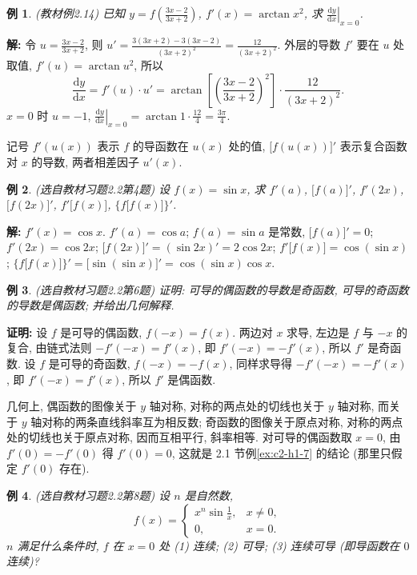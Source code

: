 \documentclass[UTF8,openany]{ctexbook}
\theoremstyle{chinesetextbook}
\newtheorem{example}{例}[section]
\newenvironment{cnproof}{\par\indent\textbf{证明:} \ignorespaces}{\par}
\newenvironment{cnsolution}{\par\indent\textbf{解:} \ignorespaces}{\par}
\newcommand{\dd}{\mathrm d}
\begin{document}
\begin{example}\label{ex:c2-2-14}
\textnormal{(教材例2.14)} 已知 $\displaystyle y=f\left(\frac{3x-2}{3x+2}\right)$, $f'(x)=\arctan x^2$, 求 $\displaystyle\left.\frac{\dd y}{\dd x}\right|_{x=0}$.
\end{example}
\begin{cnsolution}
令 $\displaystyle u=\frac{3x-2}{3x+2}$, 则 $\displaystyle u'=\frac{3(3x+2)-3(3x-2)}{(3x+2)^2}=\frac{12}{(3x+2)^2}$. 外层的导数 $f'$ 要在 $u$ 处取值, $f'(u)=\arctan u^2$, 所以
\[
\frac{\dd y}{\dd x}=f'(u)\cdot u'=\arctan\left[\left(\frac{3x-2}{3x+2}\right)^2\right]\cdot\frac{12}{(3x+2)^2}.
\]
$x=0$ 时 $u=-1$, $\displaystyle\left.\frac{\dd y}{\dd x}\right|_{x=0}=\arctan1\cdot\frac{12}4=\frac{3\pi}4$.
\end{cnsolution}
记号 $f'(u(x))$ 表示 $f$ 的导函数在 $u(x)$ 处的值, $\bigl[f(u(x))\bigr]'$ 表示复合函数对 $x$ 的导数, 两者相差因子 $u'(x)$.
\begin{example}\label{ex:c2-h2-4}
\textnormal{(选自教材习题2.2第4题)} 设 $f(x)=\sin x$, 求 $f'(a)$, $\bigl[f(a)\bigr]'$, $f'(2x)$, $\bigl[f(2x)\bigr]'$, $f'\bigl[f(x)\bigr]$, $\bigl\{f\bigl[f(x)\bigr]\bigr\}'$.
\end{example}
\begin{cnsolution}
$f'(x)=\cos x$. $f'(a)=\cos a$; $f(a)=\sin a$ 是常数, $\bigl[f(a)\bigr]'=0$; $f'(2x)=\cos2x$; $\bigl[f(2x)\bigr]'=(\sin2x)'=2\cos2x$; $f'\bigl[f(x)\bigr]=\cos(\sin x)$; $\bigl\{f\bigl[f(x)\bigr]\bigr\}'=\bigl[\sin(\sin x)\bigr]'=\cos(\sin x)\cos x$.
\end{cnsolution}
\begin{example}\label{ex:c2-h2-6}
\textnormal{(选自教材习题2.2第6题)} 证明: 可导的偶函数的导数是奇函数, 可导的奇函数的导数是偶函数; 并给出几何解释.
\end{example}
\begin{cnproof}
设 $f$ 是可导的偶函数, $f(-x)=f(x)$. 两边对 $x$ 求导, 左边是 $f$ 与 $-x$ 的复合, 由链式法则 $-f'(-x)=f'(x)$, 即 $f'(-x)=-f'(x)$, 所以 $f'$ 是奇函数. 设 $f$ 是可导的奇函数, $f(-x)=-f(x)$, 同样求导得 $-f'(-x)=-f'(x)$, 即 $f'(-x)=f'(x)$, 所以 $f'$ 是偶函数.
\end{cnproof}
几何上, 偶函数的图像关于 $y$ 轴对称, 对称的两点处的切线也关于 $y$ 轴对称, 而关于 $y$ 轴对称的两条直线斜率互为相反数; 奇函数的图像关于原点对称, 对称的两点处的切线也关于原点对称, 因而互相平行, 斜率相等. 对可导的偶函数取 $x=0$, 由 $f'(0)=-f'(0)$ 得 $f'(0)=0$, 这就是 2.1 节例\ref{ex:c2-h1-7} 的结论 (那里只假定 $f'(0)$ 存在).
\begin{example}\label{ex:c2-h2-8}
\textnormal{(选自教材习题2.2第8题)} 设 $n$ 是自然数,
\[
f(x)=\begin{cases}x^n\sin\frac1x,&x\ne0,\\0,&x=0.\end{cases}
\]
$n$ 满足什么条件时, $f$ 在 $x=0$ 处 (1) 连续; (2) 可导; (3) 连续可导 (即导函数在 $0$ 连续)?
\end{example}
\end{document}
